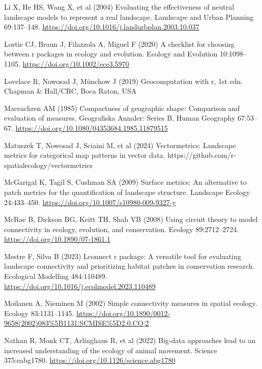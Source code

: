 \documentclass[
  10pt,
  a4paperpaper,
]{article}
\newlength{\cslhangindent}
\newenvironment{CSLReferences}[2] %
 {\begin{list}{}{%
  \setlength{\itemindent}{0pt}
  \setlength{\leftmargin}{0pt}
  \setlength{\parsep}{0pt}
  \ifodd #1
   \setlength{\leftmargin}{\cslhangindent}
   \setlength{\itemindent}{-1\cslhangindent}
  \fi
  \setlength{\itemsep}{#2\baselineskip}}}
 {\end{list}}
\begin{document}
\begin{CSLReferences}{1}{1}
Li X, He HS, Wang X, et al (2004) Evaluating the effectiveness of
neutral landscape models to represent a real landscape. Landscape and
Urban Planning 69:137--148.
\url{https://doi.org/10.1016/j.landurbplan.2003.10.037}

Lortie CJ, Braun J, Filazzola A, Miguel F (2020) A checklist for
choosing between r packages in ecology and evolution. Ecology and
Evolution 10:1098--1105. \url{https://doi.org/10.1002/ece3.5970}

Lovelace R, Nowosad J, Münchow J (2019) Geocomputation with r, 1st edn.
Chapman \& Hall/CRC, Boca Raton, USA

Maceachren AM (1985) Compactness of geographic shape: Comparison and
evaluation of measures. Geografiska Annaler: Series B, Human Geography
67:53--67. \url{https://doi.org/10.1080/04353684.1985.11879515}

Matuszek T, Nowosad J, Sciaini M, et al (2024) Vectormetrics: Landscape
metrics for categorical map patterns in vector data.
{https://github.com/r-spatialecology/vectormetrics}

McGarigal K, Tagil S, Cushman SA (2009) Surface metrics: An alternative
to patch metrics for the quantification of landscape structure.
Landscape Ecology 24:433--450.
\url{https://doi.org/10.1007/s10980-009-9327-y}

McRae B, Dickson BG, Keitt TH, Shah VB (2008) Using circuit theory to
model connectivity in ecology, evolution, and conservation. Ecology
89:2712--2724. \url{https://doi.org/10.1890/07-1861.1}

Mestre F, Silva B (2023) Lconnect r package: A versatile tool for
evaluating landscape connectivity and prioritizing habitat patches in
conservation research. Ecological Modelling 484:110489.
\url{https://doi.org/10.1016/j.ecolmodel.2023.110489}

Moilanen A, Nieminen M (2002) Simple connectivity measures in spatial
ecology. Ecology 83:1131--1145.
\url{https://doi.org/10.1890/0012-9658(2002)083\%5B1131:SCMISE\%5D2.0.CO;2}

Nathan R, Monk CT, Arlinghaus R, et al (2022) Big-data approaches lead
to an increased understanding of the ecology of animal movement. Science
375:eabg1780. \url{https://doi.org/10.1126/science.abg1780}


\end{CSLReferences}
\end{document}
